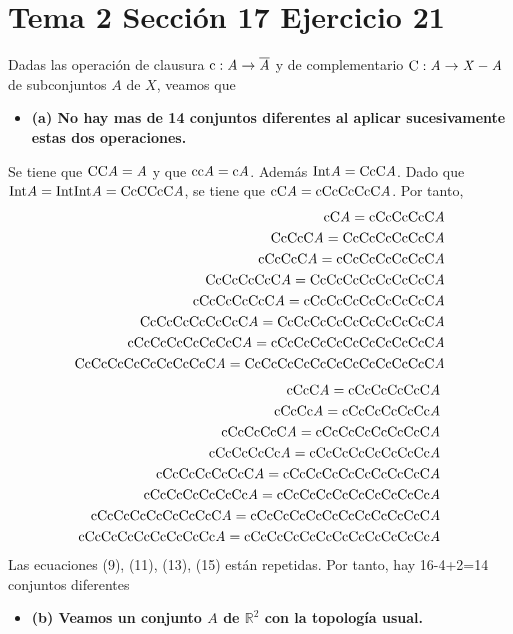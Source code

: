 \documentclass{article}
\begin{document}
\section{Tema 2 Sección 17 Ejercicio 21}
Dadas las operación de clausura $\rm c\it :A\rightarrow \overline{A}$ y de complementario $\rm C\it :A\rightarrow X-A$ de subconjuntos $A$ de $X$, veamos que

\begin{itemize}
\item \bf (a) \rm No hay mas de 14 conjuntos diferentes al aplicar sucesivamente estas dos operaciones.
\end{itemize}
Se tiene que $\rm CC\it A=A$ y que $\rm cc\it A= \rm c\it A$.
Además $\rm Int \it A= \rm CcC\it A$. Dado que $\rm Int\it A=\rm IntInt \it A= \rm CcCCcC\it A$, se tiene que $\rm cC\it A=\rm cCcCcCcC\it A$. Por tanto, 
\begin{eqnarray}
\rm cC\it A=\rm cCcCcCcC \it A\\
\rm CcCcC\it A=\rm CcCcCcCcCcC \it A\\
\rm cCcCcC\it A=\rm cCcCcCcCcCcC \it A\\
\rm CcCcCcCcC\it A=\rm CcCcCcCcCcCcCcC \it A\\
\rm cCcCcCcCcC\it A=\rm cCcCcCcCcCcCcCcC \it A\\
\rm CcCcCcCcCcCcC\it A=\rm CcCcCcCcCcCcCcCcCcC \it A\\
\rm cCcCcCcCcCcCcC\it A=\rm cCcCcCcCcCcCcCcCcCcC \it A\\
\rm CcCcCcCcCcCcCcCcC\it A=\rm CcCcCcCcCcCcCcCcCcCcCcC \it A
\end{eqnarray}
\begin{eqnarray}
\rm cCcC\it A=\rm cCcCcCcCcC \it A\\
\rm cCcCc\it A=\rm cCcCcCcCcCc \it A\\
\rm cCcCcCcC\it A=\rm cCcCcCcCcCcCcC\it A\\
\rm cCcCcCcCc\it A=\rm cCcCcCcCcCcCcCc\it A\\
\rm cCcCcCcCcCcC\it A=\rm cCcCcCcCcCcCcCcCcC\it A\\
\rm cCcCcCcCcCcCc\it A=\rm cCcCcCcCcCcCcCcCcCc\it A\\
\rm cCcCcCcCcCcCcCcC\it A=\rm cCcCcCcCcCcCcCcCcCcCcC\it A\\
\rm cCcCcCcCcCcCcCcCc\it A=\rm cCcCcCcCcCcCcCcCcCcCcCc\it A
\end{eqnarray}
Las ecuaciones (9), (11), (13), (15) están repetidas. Por tanto, hay 16-4+2=14 conjuntos diferentes
\begin{itemize}
\item \bf (b) \rm Veamos un conjunto $A$ de $\mathbb{R}^2$ con la topología usual.
\end{itemize}
\end{document}
